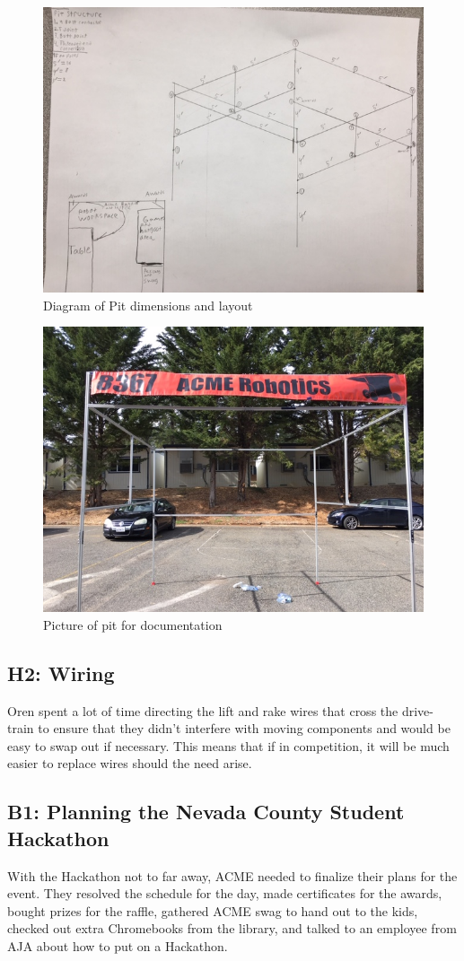 \documentclass{article}
\begin{document}
\begin{figure}
    \centering
    \includegraphics[width= 0.5 \textwidth]{30_03-25/images/pitdiagram2.JPG}
    \caption{Diagram of Pit dimensions and layout}
    \label{fig:finishedpit}
\end{figure}

\begin{figure}
    \centering
    \includegraphics[width= 0.5 \textwidth]{30_03-25/images/pitpicture.JPG}
    \caption{Picture of pit for documentation}
    \label{fig:diagram}
\end{figure}

\subsection{H2: Wiring}

Oren spent a lot of time directing the lift and rake wires that cross the drive-train to ensure that they didn't interfere with moving components and would be easy to swap out if necessary. This means that if in competition, it will be much easier to replace wires should the need arise. 

\subsection{B1: Planning the Nevada County Student Hackathon}

With the Hackathon not to far away, ACME needed to finalize their plans for the event. They resolved the schedule for the day, made certificates for the awards, bought prizes for the raffle, gathered ACME swag to hand out to the kids, checked out extra Chromebooks from the library, and talked to an employee from AJA about how to put on a Hackathon. \\
\end{document}
